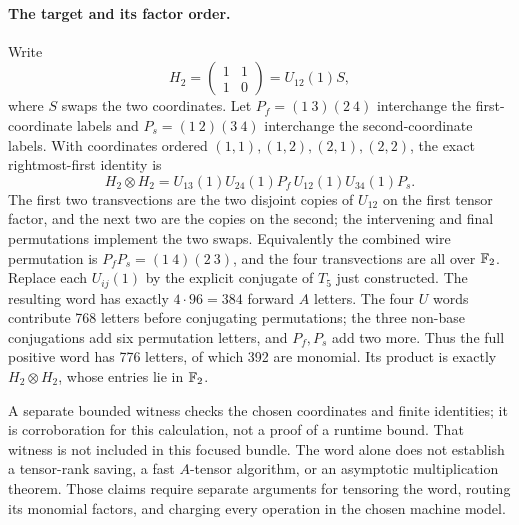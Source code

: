 \paragraph{The target and its factor order.}
Write
\[
 H_2=\begin{pmatrix}1&1\\1&0\end{pmatrix}=U_{12}(1)S,
\]
where $S$ swaps the two coordinates. Let
$P_f=(1\ 3)(2\ 4)$ interchange the first-coordinate labels and
$P_s=(1\ 2)(3\ 4)$ interchange the second-coordinate labels. With coordinates
ordered $(1,1),(1,2),(2,1),(2,2)$, the exact rightmost-first identity is
\[
 H_2\otimes H_2
   =U_{13}(1)U_{24}(1)P_f\,U_{12}(1)U_{34}(1)P_s.
\]
The first two transvections are the two disjoint copies of $U_{12}$ on
the first tensor factor, and the next two are the copies on the second;
the intervening and final permutations implement the two swaps. Equivalently
the combined wire permutation is $P_fP_s=(1\ 4)(2\ 3)$, and the four
transvections are all over $\mathbb F_2$. Replace each $U_{ij}(1)$ by the
explicit conjugate of $T_5$ just constructed. The resulting word has
exactly $4\cdot96=384$ forward $A$ letters. The four $U$ words contribute
768 letters before conjugating permutations; the three non-base
conjugations add six permutation letters, and $P_f,P_s$ add two more.
Thus the full positive word has 776 letters, of which 392 are monomial.
Its product is exactly $H_2\otimes H_2$, whose entries lie in $\mathbb F_2$.

A separate bounded witness checks the chosen coordinates and finite identities; it is corroboration for this calculation, not a proof of a runtime bound. That witness is not included in this focused bundle. The word alone
does not establish a tensor-rank saving, a fast $A$-tensor algorithm, or
an asymptotic multiplication theorem. Those claims require separate
arguments for tensoring the word, routing its monomial factors, and
charging every operation in the chosen machine model.
